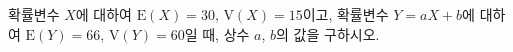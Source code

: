 확률변수 $X$에 대하여 $\mathrm{E}(X)=30$, $\mathrm{V}(X)=15$이고, 확률변수 $Y=aX+b$에 대하여 $\mathrm{E}(Y)=66$, $\mathrm{V}(Y)=60$일 때, 상수 $a$, $b$의 값을 구하시오. 
